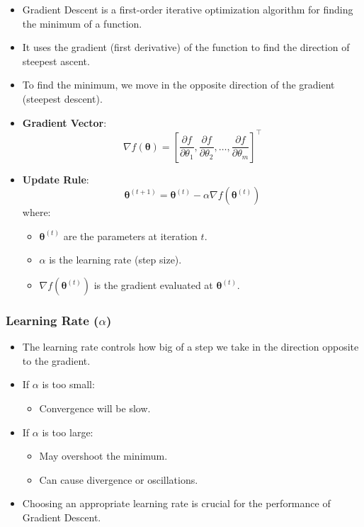 \documentclass{article}
\begin{document}
\begin{itemize}
    \item Gradient Descent is a first-order iterative optimization algorithm for finding the minimum of a function.
    \item It uses the gradient (first derivative) of the function to find the direction of steepest ascent.
    \item To find the minimum, we move in the opposite direction of the gradient (steepest descent).
    \item \textbf{Gradient Vector}:
    \[
    \nabla f(\boldsymbol{\theta}) = \left[ \frac{\partial f}{\partial \theta_1}, \frac{\partial f}{\partial \theta_2}, \dots, \frac{\partial f}{\partial \theta_m} \right]^\top
    \]
    \item \textbf{Update Rule}:
    \[
    \boldsymbol{\theta}^{(t+1)} = \boldsymbol{\theta}^{(t)} - \alpha \nabla f(\boldsymbol{\theta}^{(t)})
    \]
    where:
    \begin{itemize}
        \item $\boldsymbol{\theta}^{(t)}$ are the parameters at iteration $t$.
        \item $\alpha$ is the learning rate (step size).
        \item $\nabla f(\boldsymbol{\theta}^{(t)})$ is the gradient evaluated at $\boldsymbol{\theta}^{(t)}$.
    \end{itemize}
\end{itemize}

\subsubsection{Learning Rate ($\alpha$)}

\begin{itemize}
    \item The learning rate controls how big of a step we take in the direction opposite to the gradient.
    \item If $\alpha$ is too small:
    \begin{itemize}
        \item Convergence will be slow.
    \end{itemize}
    \item If $\alpha$ is too large:
    \begin{itemize}
        \item May overshoot the minimum.
        \item Can cause divergence or oscillations.
    \end{itemize}
    \item Choosing an appropriate learning rate is crucial for the performance of Gradient Descent.
\end{itemize}
\end{document}
